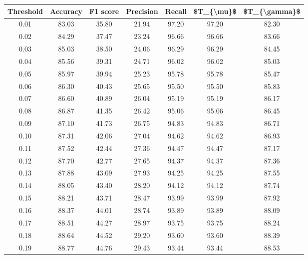 \begin{tabular}{|c|c|c|c|c|c|c|}
\hline
 Threshold &  Accuracy &  F1 score &  Precision &  Recall &  \$T\_\{\textbackslash mu\}\$ &  \$T\_\{\textbackslash gamma\}\$ \\
\hline
      0.01 &     83.03 &     35.80 &      21.94 &   97.20 &      97.20 &         82.30 \\
      0.02 &     84.29 &     37.47 &      23.24 &   96.66 &      96.66 &         83.66 \\
      0.03 &     85.03 &     38.50 &      24.06 &   96.29 &      96.29 &         84.45 \\
      0.04 &     85.56 &     39.31 &      24.71 &   96.02 &      96.02 &         85.03 \\
      0.05 &     85.97 &     39.94 &      25.23 &   95.78 &      95.78 &         85.47 \\
      0.06 &     86.30 &     40.43 &      25.65 &   95.50 &      95.50 &         85.83 \\
      0.07 &     86.60 &     40.89 &      26.04 &   95.19 &      95.19 &         86.17 \\
      0.08 &     86.87 &     41.35 &      26.42 &   95.06 &      95.06 &         86.45 \\
      0.09 &     87.10 &     41.73 &      26.75 &   94.83 &      94.83 &         86.71 \\
      0.10 &     87.31 &     42.06 &      27.04 &   94.62 &      94.62 &         86.93 \\
      0.11 &     87.52 &     42.44 &      27.36 &   94.47 &      94.47 &         87.17 \\
      0.12 &     87.70 &     42.77 &      27.65 &   94.37 &      94.37 &         87.36 \\
      0.13 &     87.88 &     43.09 &      27.93 &   94.25 &      94.25 &         87.55 \\
      0.14 &     88.05 &     43.40 &      28.20 &   94.12 &      94.12 &         87.74 \\
      0.15 &     88.21 &     43.71 &      28.47 &   93.99 &      93.99 &         87.92 \\
      0.16 &     88.37 &     44.01 &      28.74 &   93.89 &      93.89 &         88.09 \\
      0.17 &     88.51 &     44.27 &      28.97 &   93.75 &      93.75 &         88.24 \\
      0.18 &     88.64 &     44.52 &      29.20 &   93.60 &      93.60 &         88.39 \\
      0.19 &     88.77 &     44.76 &      29.43 &   93.44 &      93.44 &         88.53 \\

\end{tabular}
